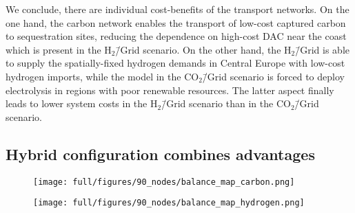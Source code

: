 \documentclass[twocolumn]{article}
\newcommand{\carbon}{CO$_2$}
\newcommand{\hydrogengrid}{H$_2$\=/Grid}
\newcommand{\carbonscenario}{CO$_2$\=/Grid scenario}
\newcommand{\hydrogenscenario}{H$_2$\=/Grid scenario}
\newcommand{\hybridscenario}{Hybrid scenario}
\begin{document}


We conclude, there are individual cost-benefits of the transport networks. On the one hand, the carbon network enables the transport of low-cost captured carbon to sequestration sites, reducing the dependence on high-cost DAC near the coast which is present in the \hydrogenscenario{}. On the other hand, the \hydrogengrid{} is able to supply the spatially-fixed hydrogen demands in Central Europe with low-cost hydrogen imports, while the model in the \carbonscenario{} is forced to deploy electrolysis in regions with poor renewable resources. The latter aspect finally leads to lower system costs in the \hydrogenscenario{} than in the \carbonscenario{}.



\subsection*{Hybrid configuration combines advantages}\label{subsec:Hybrid}


\begin{figure*}[ht!]
    \centering
    \begin{subfigure}{.5\textwidth}
        \centering
        \texttt{[image: full/figures/90\_nodes/balance\_map\_carbon.png]}
        \label{fig:balance_map_carbon_full}
    \end{subfigure}%
    \begin{subfigure}{.5\textwidth}
        \centering
        \texttt{[image: full/figures/90\_nodes/balance\_map\_hydrogen.png]}
        \label{fig:balance_map_hydrogen_full}
    \end{subfigure}
    \caption{Average operation, flows and prices of the carbon (left) and hydrogen (right) sectors in the \hybridscenario{} assuming net \carbon{} neutrality. For each region, upper semicircles show the average production per technology, lower semicircles the consumption, and colors the average marginal prices. Carbon Sequestration offshore is drawn in full circles. Lines and arrows show interregional transportation volume. Carbon from point-source in the inland either supplies local CU with imported hydrogen or facilitates sequestration in nearby offshore regions.
    }
    \label{fig:balance_map_full}
\end{figure*}
\end{document}
